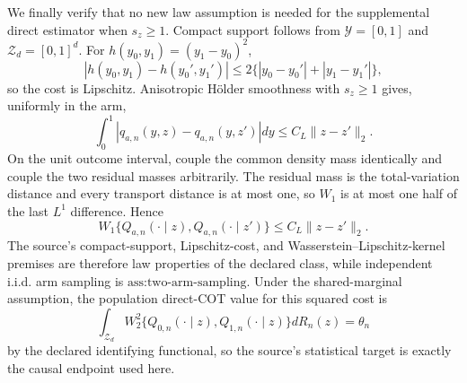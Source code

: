 We finally verify that no new law assumption is needed for the supplemental direct estimator when \(s_z\ge1\).  Compact support follows from \(\mathcal Y=[0,1]\) and \(\mathcal Z_d=[0,1]^d\).  For \(h(y_0,y_1)=(y_1-y_0)^2\),
\[
|h(y_0,y_1)-h(y_0',y_1')|
\le2\{|y_0-y_0'|+|y_1-y_1'|\},
\]
so the cost is Lipschitz.  Anisotropic H\"older smoothness with \(s_z\ge1\) gives, uniformly in the arm,
\[
\int_0^1|q_{a,n}(y,z)-q_{a,n}(y,z')|dy\le C_L\|z-z'\|_2.
\]
On the unit outcome interval, couple the common density mass identically and couple the two residual masses arbitrarily.  The residual mass is the total-variation distance and every transport distance is at most one, so \(W_1\) is at most one half of the last \(L^1\) difference.  Hence
\[
W_1\{Q_{a,n}(\cdot\mid z),Q_{a,n}(\cdot\mid z')\}
\le C_L\|z-z'\|_2. \tag{18}
\]
The source's compact-support, Lipschitz-cost, and Wasserstein--Lipschitz-kernel premises are therefore law properties of the declared class, while independent i.i.d. arm sampling is \(\text{ass:two-arm-sampling}\).  Under the shared-marginal assumption, the population direct-COT value for this squared cost is
\[
\int_{\mathcal Z_d}W_2^2\{Q_{0,n}(\cdot\mid z),Q_{1,n}(\cdot\mid z)\}dR_n(z)=\theta_n
\]
by the declared identifying functional, so the source's statistical target is exactly the causal endpoint used here.

